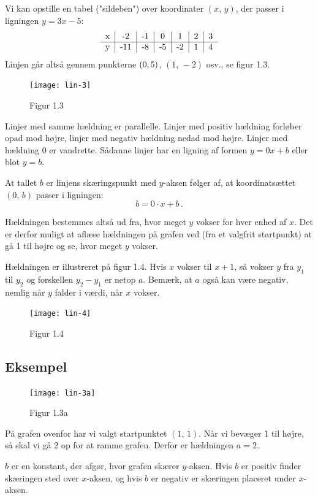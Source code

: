 \documentclass[12pt,oneside,a4paper]{article}
\begin{document}
Vi kan opstille en tabel ("sildeben") over koordinater $(x,\,y)$, der passer i
ligningen $y=3x-5$:
$$
\begin{tabular}{c|c|c|c|c|c|c}
    x &  -2 & -1 &  0 &  1 & 2 & 3 \\
    \hline
    y & -11 & -8 & -5 & -2 & 1 & 4
\end{tabular}
$$
Linjen går altså gennem punkterne $(0,\-5)$, $(1,\,-2)$ osv., se figur 1.3.

\begin{figure}[H]
    \centering
    \texttt{[image: lin-3]}
    \caption{Figur 1.3}
\end{figure}

Linjer med samme hældning er parallelle. Linjer med positiv hældning forløber
opad mod højre, linjer med negativ hældning nedad mod højre. Linjer med
hældning 0 er vandrette.  Sådanne linjer har en ligning af formen $y=0x+b$
eller blot $y=b$.

At tallet $b$ er linjens skæringspunkt med $y$-aksen følger af, at
koordinatsættet $(0,\,b)$ passer i ligningen:
$$
b = 0\cdot x+b \,.
$$

Hældningen bestemmes altså ud fra, hvor meget $y$ vokser for hver enhed af $x$. Det
er derfor muligt at aflæse hældningen på grafen ved (fra et valgfrit startpunkt)
at gå 1 til højre og se, hvor meget $y$ vokser.

Hældningen er illustreret på figur 1.4. Hvis $x$ vokser til $x+1$, så vokser
$y$ fra $y_1$ til $y_2$ og forskellen $y_2-y_1$ er netop $a$. Bemærk, at $a$
også kan være negativ, nemlig når $y$ falder i værdi, når $x$ vokser.

\begin{figure}[H]
    \centering
    \texttt{[image: lin-4]}
    \caption{Figur 1.4}
    \label{fig33}
\end{figure}


\subsection{Eksempel}
\begin{figure}[H]
    \centering
    \texttt{[image: lin-3a]}
    \caption{Figur 1.3a}
\end{figure}

På grafen ovenfor har vi valgt startpunktet $(1,\,1)$. Når vi bevæger
1 til højre, så skal vi gå 2 op for at ramme grafen. Derfor er hældningen $a=2$.

$b$ er en konstant, der afgør, hvor grafen skærer $y$-aksen. Hvis $b$ er positiv finder
skæringen sted over $x$-aksen, og hvis $b$ er negativ er skæringen placeret under $x$-aksen.
\end{document}
